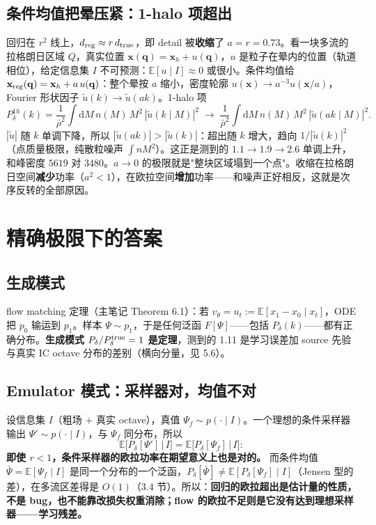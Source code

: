 \documentclass[11pt,UTF8,fontset=none]{ctexart}
\newcommand{\q}{\mathbf{q}}
\newcommand{\x}{\mathbf{x}}
\newcommand{\E}{\mathbb{E}}
\newcommand{\dd}{\mathrm{d}}
\newcommand{\Pd}{P_\delta}
\newcommand{\Psif}{\Psi_f}
\begin{document}
\subsection{条件均值把晕压紧：1-halo 项超出}

回归在 $r^2$ 线上，$d_{\rm reg}\approx r\,d_{\rm true}$，即 detail 被\textbf{收缩}了 $a=r=0.73$。看一块多流的拉格朗日区域 $Q$，真实位置 $\x(\q)=\x_h+u(\q)$，$u$ 是粒子在晕内的位置（轨道相位），给定信息集 $I$ 不可预测：$\E[u\mid I]\approx0$ 或很小。条件均值给 $\x_{\rm reg}(\q)=\x_h+a\,u(\q)$：整个晕按 $a$ 缩小，密度轮廓 $u(\x)\to a^{-3}u(\x/a)$，Fourier 形状因子 $\tilde u(k)\to\tilde u(ak)$。1-halo 项
\begin{equation}
\Pd^{1h}(k)=\frac1{\bar\rho^2}\int\dd M\,n(M)\,M^2\,|\tilde u(k\mid M)|^2
\;\longrightarrow\;
\frac1{\bar\rho^2}\int\dd M\,n(M)\,M^2\,|\tilde u(ak\mid M)|^2 .
\end{equation}
$|\tilde u|$ 随 $k$ 单调下降，所以 $|\tilde u(ak)|>|\tilde u(k)|$：超出随 $k$ 增大，趋向 $1/|\tilde u(k)|^2$（点质量极限，纯散粒噪声 $\int nM^2$）。这正是测到的 $1.1\to1.9\to2.6$ 单调上升，和峰密度 $5619$ 对 $3480$。$a\to0$ 的极限就是"整块区域塌到一个点"。收缩在拉格朗日空间\textbf{减少}功率（$a^2<1$），在欧拉空间\textbf{增加}功率——和噪声正好相反，这就是次序反转的全部原因。

\section{精确极限下的答案}

\subsection{生成模式}
flow matching 定理（主笔记 Theorem 6.1）：若 $v_\theta=u_t:=\E[x_1-x_0\mid x_t]$，ODE 把 $p_0$ 输运到 $p_1$。样本 $\Psi\sim p_1$，于是任何泛函 $F[\Psi]$——包括 $\Pd(k)$——都有正确分布。\textbf{生成模式 $\Pd/\Pd^{\rm true}=1$ 是定理}，测到的 1.11 是学习误差加 source 先验与真实 IC octave 分布的差别（横向分量，见 5.6）。

\subsection{Emulator 模式：采样器对，均值不对}
设信息集 $I$（粗场 + 真实 octave），真值 $\Psif\sim p(\cdot\mid I)$。一个理想的条件采样器输出 $\Psi'\sim p(\cdot\mid I)$，与 $\Psif$ 同分布，所以
\begin{equation}
\E\big[\Pd[\Psi']\,\big|\,I\big]=\E\big[\Pd[\Psif]\,\big|\,I\big]:
\end{equation}
\textbf{即使 $r<1$，条件采样器的欧拉功率在期望意义上也是对的。} 而条件均值 $\bar\Psi=\E[\Psif\mid I]$ 是同一个分布的一个泛函，$\Pd[\bar\Psi]\ne\E[\Pd[\Psif]\mid I]$（Jensen 型的差），在多流区差得是 $O(1)$（3.4 节）。所以：\textbf{回归的欧拉超出是估计量的性质，不是 bug，也不能靠改损失权重消除；flow 的欧拉不足则是它没有达到理想采样器——学习残差。}
\end{document}
